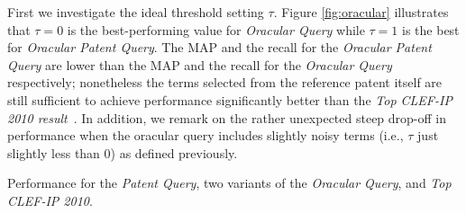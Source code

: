 First we investigate the ideal threshold setting $\tau$.
Figure \ref{fig:oracular} illustrates that $\tau=0$ is the
best-performing value for {\em Oracular Query} while $\tau=1$ is the
best for {\em Oracular Patent Query}.  The MAP and the recall for the {\em Oracular
Patent Query} are lower than the MAP and the recall for the {\em Oracular Query} respectively;
nonetheless the terms selected from the reference patent itself are
still sufficient to achieve performance significantly better than the
{\em Top CLEF-IP 2010 result}~\cite{lopez2010experiments}.  In addition, we remark on the rather
unexpected steep drop-off in performance when the oracular query
includes slightly noisy terms (i.e., $\tau$ just slightly less than 0)
as defined previously.

%
%
%
%

\begin{table}[t!]
  \begin{center}
   \caption{Performance for the {\em Patent Query}, two variants of the {\em Oracular Query}, and {\em Top CLEF-IP 2010}.}
   \vspace*{1ex}
     
  \label{tab:optquery}
  \end{center}  
\end{table}


